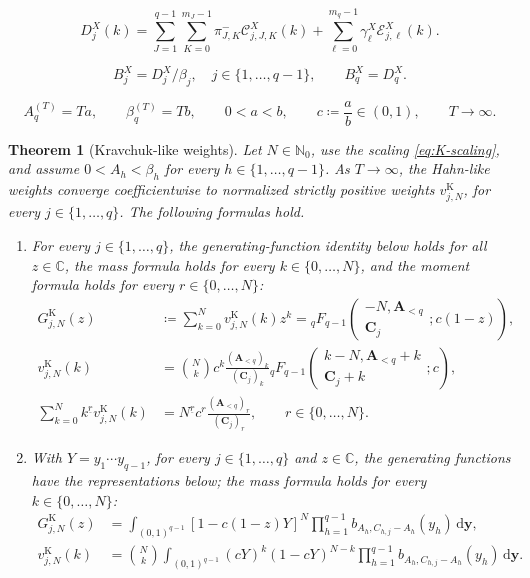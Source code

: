 \documentclass[10pt,a4paper]{amsart}
\newtheorem{theorem}{Theorem}
\newcommand{\A}{\boldsymbol A}
\newcommand{\Nzero}{\mathbb N_0}
\newcommand{\dd}{\,\mathrm d}
\newcommand{\fall}[2]{#1^{\underline{#2}}}
\newcommand{\pFq}[5]{{}_{#1}F_{#2}\!\left(\begin{matrix}#3\\#4\end{matrix};#5\right)}
\begin{document}
\begin{equation}
 D_j^X(k)=
 \sum_{J=1}^{q-1}\sum_{K=0}^{m_J-1}
 \pi_{J,K}^{-}\mathcal C_{j,J,K}^X(k)
 +\sum_{\ell=0}^{m_q-1}
 \gamma_\ell^X\mathcal E_{j,\ell}^X(k).
 \label{eq:unreflected-explicit-components}
\end{equation}

\begin{equation}
 B_j^X=D_j^X/\beta_j,\quad j\in\{1,\ldots,q-1\},
 \qquad B_q^X=D_q^X.
 \label{eq:unreflected-probability-components}
\end{equation}

\begin{equation}
 A_q^{(T)}=Ta,\qquad
 \beta_q^{(T)}=Tb,\qquad
 0<a<b,\qquad
 c\coloneq\frac ab\in(0,1),\qquad T\to\infty.
 \label{eq:K-scaling}
\end{equation}

\begin{theorem}[Kravchuk-like weights]
\label{thm:K-rows}
Let \(N\in\Nzero\), use the scaling \eqref{eq:K-scaling}, and assume
\(0<A_h<\beta_h\) for every \(h\in\{1,\ldots,q-1\}\). As
\(T\to\infty\), the Hahn-like weights converge
coefficientwise to normalized strictly positive weights
\(v_{j,N}^{\mathrm K}\), for every \(j\in\{1,\ldots,q\}\). The following
formulas hold.
\begin{enumerate}[label=\textup{(\roman*)}]
\item For every \(j\in\{1,\ldots,q\}\), the generating-function identity
below holds for all \(z\in\mathbb C\), the mass formula holds for every
\(k\in\{0,\ldots,N\}\), and the moment formula holds for every
\(r\in\{0,\ldots,N\}\):
\begin{align}
 G_{j,N}^{\mathrm K}(z)
 &\coloneq\sum_{k=0}^Nv_{j,N}^{\mathrm K}(k)z^k
 =\pFq{q}{q-1}
 {-N,\A_{<q}}{\boldsymbol C_j}{c(1-z)},
 \label{eq:K-pgf}\\
 v_{j,N}^{\mathrm K}(k)
 &=\binom Nk c^k
 \frac{(\A_{<q})_k}{(\boldsymbol C_j)_k}
 \pFq{q}{q-1}
 {k-N,\A_{<q}+k}{\boldsymbol C_j+k}{c},
 \label{eq:K-mass}\\
 \sum_{k=0}^N\fall{k}{r}v_{j,N}^{\mathrm K}(k)
 &=\fall{N}{r}c^r
 \frac{(\A_{<q})_r}{(\boldsymbol C_j)_r},
 \qquad r\in\{0,\ldots,N\}.
 \label{eq:K-factorial-moments}
\end{align}
\item With \(Y=y_1\cdots y_{q-1}\), for every
\(j\in\{1,\ldots,q\}\) and \(z\in\mathbb C\), the generating functions
have the representations below; the mass formula holds for every
\(k\in\{0,\ldots,N\}\):
\begin{align}
 G_{j,N}^{\mathrm K}(z)
 &=
 \int_{(0,1)^{q-1}}
 [1-c(1-z)Y]^N
 \prod_{h=1}^{q-1}b_{A_h,C_{h,j}-A_h}(y_h)
 \dd\boldsymbol y,
 \label{eq:K-positive-pgf}\\
 v_{j,N}^{\mathrm K}(k)
 &=
 \binom Nk
 \int_{(0,1)^{q-1}}
 (cY)^k(1-cY)^{N-k}
 \prod_{h=1}^{q-1}b_{A_h,C_{h,j}-A_h}(y_h)
 \dd\boldsymbol y.
 \label{eq:K-positive-mass}
\end{align}
\end{enumerate}
\end{theorem}
\end{document}
